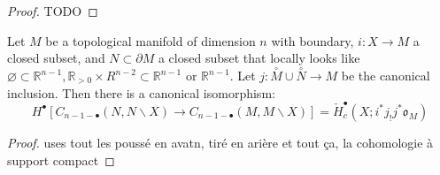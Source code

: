 \begin{proof}
    TODO
\end{proof}

\begin{lemma}\label{lem:poincare-lefschetz_duality}
    Let $M$ be a topological manifold of dimension $n$ with boundary, $i:X\to M$ a closed subset, and $N\subset \partial M$ a closed subset that locally looks like $\varnothing\subset \mathbb{R}^{n-1}, \mathbb{R}_{>0}\times R^{n-2}\subset \mathbb{R}^{n-1}$ or $\mathbb{R}^{n-1}$. Let $j:\overset{\circ}{M}\cup \overset{\circ}{N}\to M$ be the canonical inclusion. Then there is a canonical isomorphism:
        \[ H^{\bullet}[C_{n-1-\bullet}(N,N\backslash X)\to C_{n-1-\bullet}(M,M\backslash X)]=\check{H}_c^{\bullet}(X;i^*j_!j^*\mathfrak{o}_M)\]


\end{lemma}

\begin{proof}
    uses tout les poussé en avatn, tiré en arière et tout ça, la cohomologie à support compact 
\end{proof}